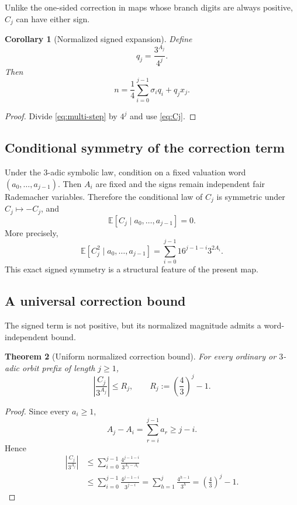 \documentclass[11pt]{article}
\newtheorem{theorem}{Theorem}[section]
\newtheorem{corollary}[theorem]{Corollary}
\theoremstyle{definition}
\theoremstyle{remark}
\newcommand{\E}{\mathbb E}
\begin{document}
Unlike the one-sided correction in maps whose branch digits are always positive, $C_j$ can have either sign.

\begin{corollary}[Normalized signed expansion]
Define
\[
q_j=\frac{3^{A_j}}{4^j}.
\]
Then
\begin{equation}
n
=
\frac14\sum_{i=0}^{j-1}\sigma_i q_i
+q_jx_j.
\label{eq:normalized-expansion}
\end{equation}
\end{corollary}

\begin{proof}
Divide \eqref{eq:multi-step} by $4^j$ and use \eqref{eq:Cj}.
\end{proof}

\subsection{Conditional symmetry of the correction term}

Under the $3$-adic symbolic law, condition on a fixed valuation word $(a_0,\ldots,a_{j-1})$.  Then $A_i$ are fixed and the signs remain independent fair Rademacher variables.  Therefore the conditional law of $C_j$ is symmetric under $C_j\mapsto-C_j$, and
\[
\E[C_j\mid a_0,\ldots,a_{j-1}]=0.
\]
More precisely,
\[
\E[C_j^2\mid a_0,\ldots,a_{j-1}]
=
\sum_{i=0}^{j-1}16^{j-1-i}3^{2A_i}.
\]
This exact signed symmetry is a structural feature of the present map.

\subsection{A universal correction bound}

The signed term is not positive, but its normalized magnitude admits a word-independent bound.

\begin{theorem}[Uniform normalized correction bound]
For every ordinary or $3$-adic orbit prefix of length $j\ge1$,
\begin{equation}
\left|\frac{C_j}{3^{A_j}}\right|
\le
R_j,
\qquad
R_j:=\left(\frac43\right)^j-1.
\label{eq:uniform-correction}
\end{equation}
\end{theorem}

\begin{proof}
Since every $a_i\ge1$,
\[
A_j-A_i=\sum_{r=i}^{j-1}a_r\ge j-i.
\]
Hence
\begin{align*}
\left|\frac{C_j}{3^{A_j}}\right|
&\le
\sum_{i=0}^{j-1}
\frac{4^{j-1-i}}{3^{A_j-A_i}}\\
&\le
\sum_{i=0}^{j-1}
\frac{4^{j-1-i}}{3^{j-i}}
=
\sum_{h=1}^{j}\frac{4^{h-1}}{3^h}
=
\left(\frac43\right)^j-1.
\end{align*}
\end{proof}
\end{document}
